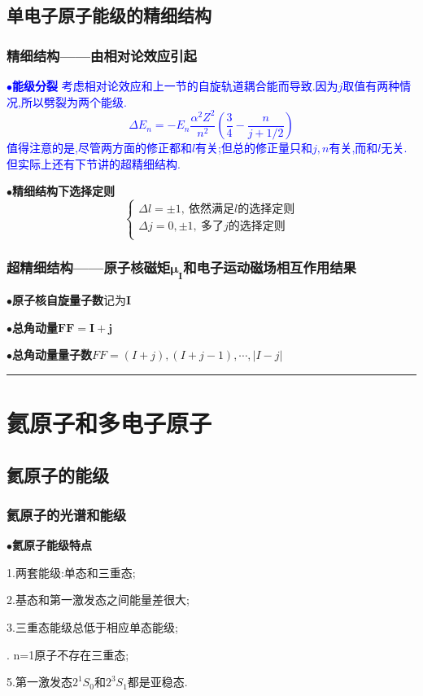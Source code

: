 \documentclass[UTF8]{article}
\newcommand{\keypoint}[2]{$\bullet$\textbf{#1}\quad#2\par}
\begin{document}
\subsection{单电子原子能级的精细结构}
\subsubsection{精细结构——由相对论效应引起}
\textcolor{blue}{\keypoint{能级分裂}{
	考虑相对论效应和上一节的自旋轨道耦合能而导致.因为$j$取值有两种情况,所以劈裂为两个能级.
	$$\Delta E_n=-E_n\frac{\alpha^2Z^2}{n^2}\left(\frac{3}{4}-\frac{n}{j+1/2}\right)$$
	值得注意的是,尽管两方面的修正都和$l$有关;但总的修正量只和$j,n$有关,而和$l$无关.但实际上还有下节讲的超精细结构.
}}
\keypoint{精细结构下选择定则}{
	$$
	\left\{
	\begin{array}{l}
	\Delta l=\pm1,\ \mbox{依然满足$l$的选择定则}\\
	\Delta j=0,\pm1,\ \mbox{多了$j$的选择定则}\\
	\end{array}
	\right.
	$$
}
\subsubsection{超精细结构——原子核磁矩$\bm{\mu_I}$和电子运动磁场相互作用结果}
\keypoint{原子核自旋量子数}{记为$\bm{I}$}
\keypoint{总角动量$\bm{F}$}{$\bm{F}=\bm{I}+\bm{j}$}
\keypoint{总角动量量子数$F$}{$F=(I+j),(I+j-1),\cdots,|I-j|$}

\rule{\textwidth}{0.50mm}


\section{氦原子和多电子原子}
\subsection{氦原子的能级}
\subsubsection{氦原子的光谱和能级}
\keypoint{氦原子能级特点}{
	\par \qquad1.两套能级:单态和三重态;
	\par \qquad2.基态和第一激发态之间能量差很大;
	\par \qquad3.三重态能级总低于相应单态能级;
	\par \qquad4. n=1原子不存在三重态;
	\par \qquad5.第一激发态$2^1S_0$和$2^3S_1$都是亚稳态.
}
\end{document}
